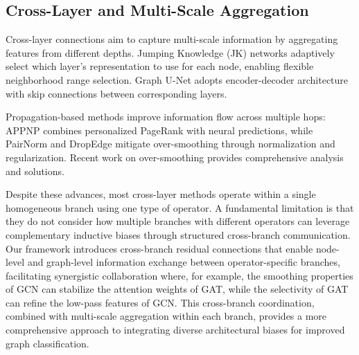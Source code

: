 \subsection{Cross-Layer and Multi-Scale Aggregation}

Cross-layer connections aim to capture multi-scale information by aggregating features from different depths. Jumping Knowledge (JK) networks \cite{xu2018representation} adaptively select which layer's representation to use for each node, enabling flexible neighborhood range selection. Graph U-Net \cite{gao2019graph} adopts encoder-decoder architecture with skip connections between corresponding layers.

Propagation-based methods improve information flow across multiple hops: APPNP \cite{klicpera2018combining} combines personalized PageRank with neural predictions, while PairNorm \cite{zhao2020pair} and DropEdge \cite{rong2019dropedge} mitigate over-smoothing through normalization and regularization. Recent work on over-smoothing \cite{chen2023revisiting, zhao2020tackling} provides comprehensive analysis and solutions.

Despite these advances, most cross-layer methods operate within a single homogeneous branch using one type of operator. A fundamental limitation is that they do not consider how multiple branches with different operators can leverage complementary inductive biases through structured cross-branch communication. Our framework introduces cross-branch residual connections that enable node-level and graph-level information exchange between operator-specific branches, facilitating synergistic collaboration where, for example, the smoothing properties of GCN can stabilize the attention weights of GAT, while the selectivity of GAT can refine the low-pass features of GCN. This cross-branch coordination, combined with multi-scale aggregation within each branch, provides a more comprehensive approach to integrating diverse architectural biases for improved graph classification.
